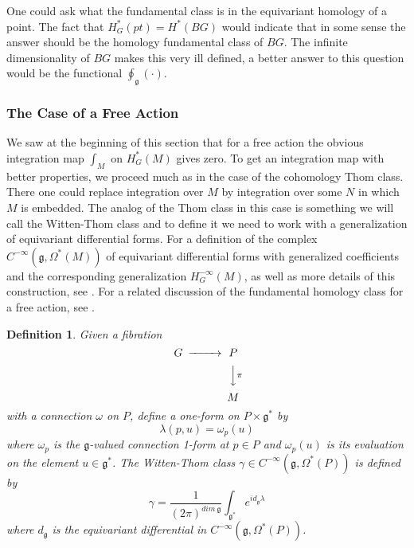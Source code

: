 \documentclass[a4paper,a4paper]{article}
\newtheorem{define}{Definition}
\theoremstyle{conjecture}
\begin{document}
One could ask what the fundamental class is in the equivariant homology of a point.  The fact
that $H^*_G(pt)=H^*(BG)$ would indicate that in some sense the answer should be the homology fundamental
class of $BG$.  The infinite dimensionality of $BG$ makes this very ill defined, a better answer
to this question would be the functional $\oint_{\mathfrak g}(\cdot)$.

\subsubsection{The Case of a Free Action}

We saw at the beginning of this section that for a free action the obvious
integration map $\int_M$ on $H^*_G(M)$ gives zero.  To get an integration
map with better properties, we proceed much as in the case of the cohomology
Thom class. There one could replace integration over $M$ by integration
over some $N$ in which $M$ is embedded.  
The analog of the Thom class in this
case is something we will call the Witten-Thom class \cite{Witten-localization} and to define it we need
to work with a generalization of equivariant differential forms.  For a 
definition of the complex $C^{-\infty}({\mathfrak g},\Omega^*(M))$ of equivariant differential
forms with generalized coefficients and the corresponding generalization $H^{-\infty}_G(M)$, as
well as more details of this construction, see 
\cite{Kumar-Vergne}.  For a related discussion of the fundamental homology class for a free action, 
see \cite{Austin-Braam}.

\begin{define}
Given a fibration
\begin {equation*}
\begin{CD}
G @>>>P \\
@. @VV\pi V\\
{} @. M
\end{CD}
\end{equation*}
with a connection $\omega$ on $P$, define a one-form on $P\times \mathfrak g^*$
by
$$\lambda(p,u)=\omega _p(u)$$
where $\omega _p$ is the $\mathfrak g$-valued connection 1-form at $p\in P$ and 
$\omega _p(u)$ is its evaluation on the element $u\in \mathfrak g^*$. The Witten-Thom
class $\gamma \in C^{-\infty}({\mathfrak g},\Omega^*(P))$ is defined by
$$\gamma=\frac{1}{(2\pi)^{dim\ \mathfrak g}}\int_{{\mathfrak g}^*}e^{id_{\mathfrak g}\lambda}$$
where $d_{\mathfrak g}$ is the equivariant differential in $C^{-\infty}({\mathfrak g},\Omega^*(P))$.
\end{define}
\end{document}
